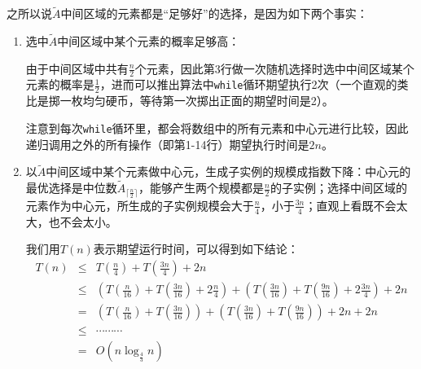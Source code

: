 	之所以说$\tilde{A}$中间区域的元素都是“足够好”的选择，是因为如下两个事实：
\begin{enumerate}[(1)]
	\item 选中$\tilde{A}$中间区域中某个元素的概率足够高：
	
	由于中间区域中共有$\frac{n}{2}$个元素，因此第3行做一次随机选择时选中中间区域某个元素的概率是$\frac{1}{2}$，进而可以推出算法中{\tt while}循环期望执行2次（一个直观的类比是掷一枚均匀硬币，等待第一次掷出正面的期望时间是2）。
	
	注意到每次{\tt while}循环里，都会将数组中的所有元素和中心元进行比较，因此递归调用之外的所有操作（即第1-14行）期望执行时间是$2n$。
	

	\item 以$\tilde{A}$中间区域中某个元素做中心元，生成子实例的规模成指数下降：中心元的最优选择是中位数$\tilde{A}_{\lceil\frac{n}{2}\rceil}$，能够产生两个规模都是$\frac{n}{2}$的子实例；选择中间区域的元素作为中心元，所生成的子实例规模会大于$\frac{n}{4}$，小于$\frac{3n}{4}$；直观上看既不会太大，也不会太小。
	
	我们用$T(n)$表示期望运行时间，可以得到如下结论：
\begin{eqnarray}
T(n) &\leq& T(\frac{n}{4})  + T(\frac{3n}{4}) + 2n \nonumber \\
       &\leq& (T(\frac{n}{16}) + T(\frac{3n}{16}) + 2\frac{n}{4} ) + (T(\frac{3n}{16}) + T(\frac{9n}{16}) + 2\frac{3n}{4}) + 2n \nonumber \\
       &=&   (T(\frac{n}{16}) + T(\frac{3n}{16})) + (T(\frac{3n}{16}) + T(\frac{9n}{16}) ) + 2n + 2n \nonumber \\ 
       &\leq& \cdots \cdots \cdots \nonumber \\
       &=& O(n \log_{\tfrac{4}{3}} n ) \nonumber 
 \end{eqnarray}

\end{enumerate}




